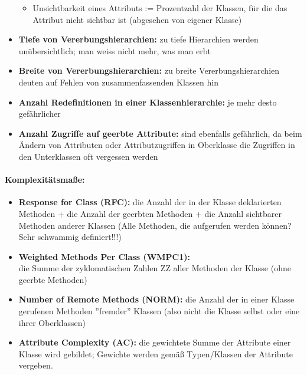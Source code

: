 \begin{itemize}
\begin{itemize}
		\item Unsichtbarkeit eines Attributs := Prozentzahl der Klassen, für die das Attribut nicht sichtbar ist (abgesehen von eigener Klasse)
	\end{itemize}
	\item \textbf{Tiefe von Vererbungshierarchien:} zu tiefe Hierarchien werden unübersichtlich; man weiss nicht mehr, was man erbt
	\item \textbf{Breite von Vererbungshierarchien:} zu breite Vererbungshierarchien deuten auf Fehlen von zusammenfassenden Klassen hin
	\item \textbf{Anzahl Redefinitionen in einer Klassenhierarchie:} je mehr desto gefährlicher
	\item \textbf{Anzahl Zugriffe auf geerbte Attribute:} sind ebenfalls gefährlich, da beim Ändern von Attributen oder Attributzugriffen in Oberklasse die Zugriffen in den Unterklassen oft vergessen werden
\end{itemize}

\paragraph{Komplexitätsmaße:}
\begin{itemize}
	\item \textbf{Response for Class (RFC):}
	die Anzahl der in der Klasse deklarierten Methoden + die Anzahl der geerbten Methoden + die Anzahl sichtbarer Methoden anderer Klassen (Alle Methoden, die aufgerufen werden können? Sehr schwammig definiert!!!)
	\item \textbf{Weighted Methods Per Class (WMPC1):} \\
	die Summe der zyklomatischen Zahlen ZZ aller Methoden der Klasse (ohne geerbte Methoden)
	\item \textbf{Number of Remote Methods (NORM):}
	die Anzahl der in einer Klasse gerufenen Methoden ''fremder'' Klassen (also nicht die Klasse selbst oder eine ihrer Oberklassen)
	\item \textbf{Attribute Complexity (AC):}
	die gewichtete Summe der Attribute einer Klasse wird gebildet; Gewichte werden gemäß Typen/Klassen der Attribute vergeben. 
\end{itemize}


